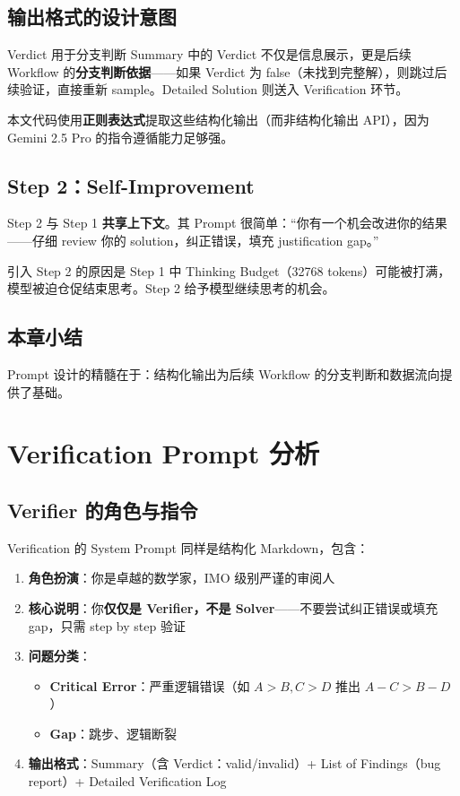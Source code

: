 \documentclass[a4paper]{article}
\begin{document}
\subsection{输出格式的设计意图}

\begin{importantbox}{Verdict 用于分支判断}
Summary 中的 Verdict 不仅是信息展示，更是后续 Workflow 的\textbf{分支判断依据}——如果 Verdict 为 false（未找到完整解），则跳过后续验证，直接重新 sample。Detailed Solution 则送入 Verification 环节。
\end{importantbox}

本文代码使用\textbf{正则表达式}提取这些结构化输出（而非结构化输出 API），因为 Gemini 2.5 Pro 的指令遵循能力足够强。

\subsection{Step 2：Self-Improvement}

Step 2 与 Step 1 \textbf{共享上下文}。其 Prompt 很简单：``你有一个机会改进你的结果——仔细 review 你的 solution，纠正错误，填充 justification gap。''

引入 Step 2 的原因是 Step 1 中 Thinking Budget（32768 tokens）可能被打满，模型被迫仓促结束思考。Step 2 给予模型继续思考的机会。

\subsection{本章小结}

Prompt 设计的精髓在于：结构化输出为后续 Workflow 的分支判断和数据流向提供了基础。

\section{Verification Prompt 分析}

\subsection{Verifier 的角色与指令}

Verification 的 System Prompt 同样是结构化 Markdown，包含：

\begin{enumerate}
    \item \textbf{角色扮演}：你是卓越的数学家，IMO 级别严谨的审阅人
    \item \textbf{核心说明}：你\textbf{仅仅是 Verifier，不是 Solver}——不要尝试纠正错误或填充 gap，只需 step by step 验证
    \item \textbf{问题分类}：
    \begin{itemize}
        \item \textbf{Critical Error}：严重逻辑错误（如 $A > B, C > D$ 推出 $A-C > B-D$）
        \item \textbf{Gap}：跳步、逻辑断裂
    \end{itemize}
    \item \textbf{输出格式}：Summary（含 Verdict：valid/invalid）+ List of Findings（bug report）+ Detailed Verification Log
\end{enumerate}
\end{document}

